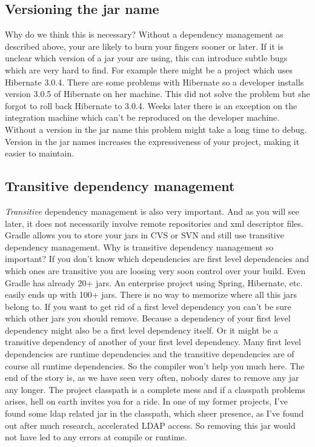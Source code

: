 \subsection{Versioning the jar name} %
\label{sub:versioning_the_jar_name}
Why do we think this is necessary? Without a dependency management as described above, your are likely to burn your fingers sooner or later. If it is unclear which version of a jar your are using, this can introduce subtle bugs which are very hard to find. For example there might be a project which uses Hibernate 3.0.4. There are some problems with Hibernate so a developer installs version  3.0.5 of Hibernate on her machine. This did not solve the problem but she forgot to roll back Hibernate to 3.0.4. Weeks later there is an exception on the integration machine which can't be reproduced on the developer machine. Without a version in the jar name this problem might take a long time to debug. Version in the jar names increases the expressiveness of your project, making it easier to maintain. 

\subsection{Transitive dependency management} %
\label{sub:transitive_dependency_management}
\emph{Transitive} dependency management is also very important. And as you will see later, it does not necessarily involve remote repositories and xml descriptor files. Gradle allows you to store your jars in CVS or SVN and still use transitive dependency management. Why is transitive dependency management so important? If you don't know which dependencies are first level dependencies and which ones are transitive you are loosing very soon control over your build. Even Gradle has already 20+ jars. An enterprise project using Spring, Hibernate, etc. easily ends up with 100+ jars. There is no way to memorize where all this jars belong to. If you want to get rid of a first level dependency you can't be sure which other jars you should remove. Because a dependency of your first level dependency might also be a first level dependency itself. Or it might be a transitive dependency of another of your first level dependency. Many first level dependencies are runtime dependencies and the transitive dependencies are of course all runtime dependencies. So the compiler won't help you much here. The end of the story is, as we have seen very often, nobody dares to remove any jar any longer. The project classpath is a complete mess and if a classpath problems arises, hell on earth invites you for a ride. In one of my former projects, I've found some ldap related jar in the classpath, which sheer presence, as I've found out after much research, accelerated LDAP access. So removing this jar would not have led to any errors at compile or runtime. 

